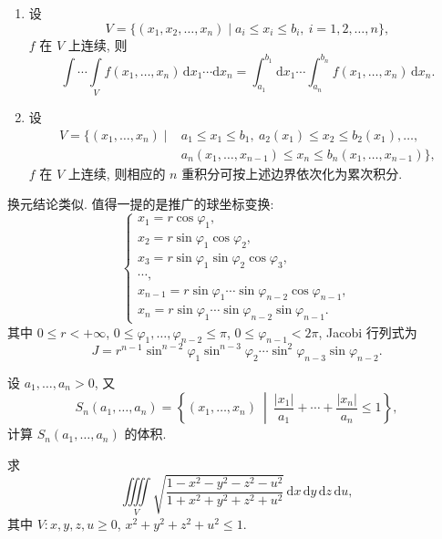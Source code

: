 \documentclass[../数学分析培优讲义.tex]{subfiles}
\begin{document}
\begin{theorem}
\begin{enumerate}[label=(\arabic*)]
    \item 设
    \[
        V=\{(x_1,x_2,\ldots,x_n)\mid a_i\leq x_i\leq b_i,\ i=1,2,\ldots,n\},
    \]
    $f$ 在 $V$ 上连续, 则
    \[
        \int\cdots\int\limits_V f(x_1,\ldots,x_n)\,\mathrm{d}x_1\cdots\mathrm{d}x_n
        =\int_{a_1}^{b_1}\mathrm{d}x_1\cdots\int_{a_n}^{b_n}f(x_1,\ldots,x_n)\,\mathrm{d}x_n.
    \]

    \item 设
    \[
    \begin{aligned}
        V=\{(x_1,\ldots,x_n)\mid{}&a_1\leq x_1\leq b_1,\ a_2(x_1)\leq x_2\leq b_2(x_1),\ldots,\\
        &a_n(x_1,\ldots,x_{n-1})\leq x_n\leq b_n(x_1,\ldots,x_{n-1})\},
    \end{aligned}
    \]
    $f$ 在 $V$ 上连续, 则相应的 $n$ 重积分可按上述边界依次化为累次积分.
\end{enumerate}
\end{theorem}

换元结论类似. 值得一提的是推广的球坐标变换:
\[
\begin{cases}
    x_1=r\cos\varphi_1,\\
    x_2=r\sin\varphi_1\cos\varphi_2,\\
    x_3=r\sin\varphi_1\sin\varphi_2\cos\varphi_3,\\
    \cdots,\\
    x_{n-1}=r\sin\varphi_1\cdots\sin\varphi_{n-2}\cos\varphi_{n-1},\\
    x_n=r\sin\varphi_1\cdots\sin\varphi_{n-2}\sin\varphi_{n-1}.
\end{cases}
\]
其中 $0\leq r<+\infty$, $0\leq\varphi_1,\ldots,\varphi_{n-2}\leq\pi$, $0\leq\varphi_{n-1}<2\pi$, Jacobi 行列式为
\[
    J=r^{n-1}\sin^{n-2}\varphi_1\sin^{n-3}\varphi_2\cdots\sin^2\varphi_{n-3}\sin\varphi_{n-2}.
\]

\begin{example}
设 $a_1,\ldots,a_n>0$, 又
\[
    S_n(a_1,\ldots,a_n)=\left\{(x_1,\ldots,x_n)\ \middle|\ \dfrac{|x_1|}{a_1}+\cdots+\dfrac{|x_n|}{a_n}\leq1\right\},
\]
计算 $S_n(a_1,\ldots,a_n)$ 的体积.
\end{example}
\exampleblank

\begin{example}
求
\[
    \iiiint\limits_V\sqrt{\dfrac{1-x^2-y^2-z^2-u^2}{1+x^2+y^2+z^2+u^2}}\,
    \mathrm{d}x\,\mathrm{d}y\,\mathrm{d}z\,\mathrm{d}u,
\]
其中 $V:x,y,z,u\geq0$, $x^2+y^2+z^2+u^2\leq1$.
\end{example}
\exampleblank
\end{document}
